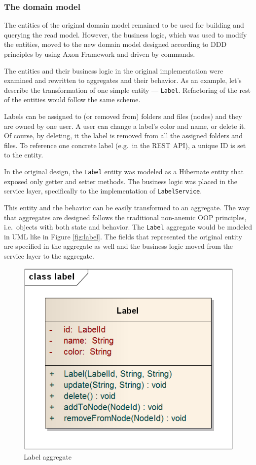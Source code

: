 \documentclass{book}
\begin{document}
\subsubsection{The domain model}\label{the-domain-model}

The entities of the original domain model remained to be used for
building and querying the read model. However, the business logic, which
was used to modify the entities, moved to the new domain model designed
according to DDD principles by using Axon Framework and driven by
commands.

The entities and their business logic in the original implementation
were examined and rewritten to aggregates and their behavior. As an
example, let's describe the transformation of one simple entity ---
\texttt{Label}. Refactoring of the rest of the entities would follow the
same scheme.

Labels can be assigned to (or removed from) folders and files (nodes)
and they are owned by one user. A user can change a label's color and
name, or delete it. Of course, by deleting, it the label is removed from
all the assigned folders and files. To reference one concrete label
(e.g.~in the REST API), a unique ID is set to the entity.

In the original design, the \texttt{Label} entity was modeled as a
Hibernate entity that exposed only getter and setter methods. The
business logic was placed in the service layer, specifically to the
implementation of \texttt{LabelService}.

This entity and the behavior can be easily transformed to an aggregate.
The way that aggregates are designed follows the traditional non-anemic
OOP principles, i.e.~objects with both state and behavior. The
\texttt{Label} aggregate would be modeled in UML like in Figure
\ref{fig:label}. The fields that represented the original entity are
specified in the aggregate as well and the business logic moved from the
service layer to the aggregate.


\begin{figure}[h!]
\begin{center}
\includegraphics[width=0.35\columnwidth]{figures/label/label}
\caption{Label aggregate%
}
\end{center}
\end{figure}
\end{document}
